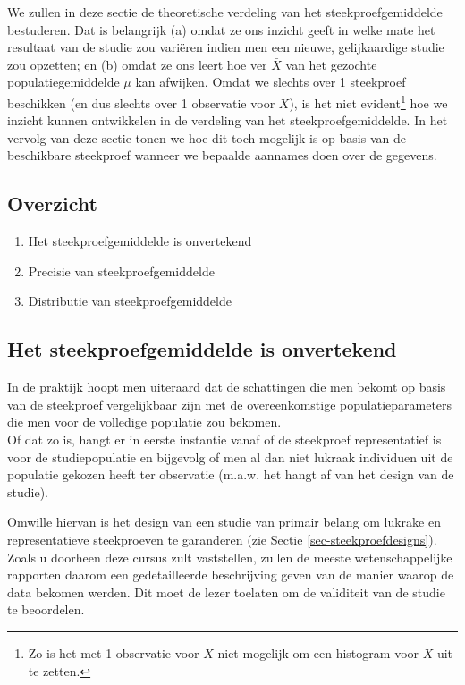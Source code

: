 \documentclass[
  dutch,
  letterpaper,
  12pt]{book}
\providecommand{\tightlist}{%
  \setlength{\itemsep}{0pt}\setlength{\parskip}{0pt}}
\theoremstyle{definition}
\theoremstyle{definition}
\theoremstyle{definition}
\theoremstyle{remark}
\begin{document}
We zullen in deze sectie de theoretische verdeling van het
steekproefgemiddelde bestuderen. Dat is belangrijk (a) omdat ze ons
inzicht geeft in welke mate het resultaat van de studie zou variëren
indien men een nieuwe, gelijkaardige studie zou opzetten; en (b) omdat
ze ons leert hoe ver \(\bar X\) van het gezochte populatiegemiddelde
\(\mu\) kan afwijken. Omdat we slechts over 1 steekproef beschikken (en
dus slechts over 1 observatie voor \(\bar X\)), is het niet
evident\footnote{Zo is het met 1 observatie voor \(\bar X\) niet
  mogelijk om een histogram voor \(\bar X\) uit te zetten.} hoe we
inzicht kunnen ontwikkelen in de verdeling van het steekproefgemiddelde.
In het vervolg van deze sectie tonen we hoe dit toch mogelijk is op
basis van de beschikbare steekproef wanneer we bepaalde aannames doen
over de gegevens.

\subsection{Overzicht}\label{overzicht}

\begin{enumerate}
\def\labelenumi{\arabic{enumi}.}
\tightlist
\item
  Het steekproefgemiddelde is onvertekend
\item
  Precisie van steekproefgemiddelde
\item
  Distributie van steekproefgemiddelde
\end{enumerate}

\subsection{Het steekproefgemiddelde is
onvertekend}\label{het-steekproefgemiddelde-is-onvertekend}

In de praktijk hoopt men uiteraard dat de schattingen die men bekomt op
basis van de steekproef vergelijkbaar zijn met de overeenkomstige
populatieparameters die men voor de volledige populatie zou bekomen.\\
Of dat zo is, hangt er in eerste instantie vanaf of de steekproef
representatief is voor de studiepopulatie en bijgevolg of men al dan
niet lukraak individuen uit de populatie gekozen heeft ter observatie
(m.a.w. het hangt af van het design van de studie).

Omwille hiervan is het design van een studie van primair belang om
lukrake en representatieve steekproeven te garanderen (zie Sectie
\ref{sec-steekproefdesigns}). Zoals u doorheen deze cursus zult
vaststellen, zullen de meeste wetenschappelijke rapporten daarom een
gedetailleerde beschrijving geven van de manier waarop de data bekomen
werden. Dit moet de lezer toelaten om de validiteit van de studie te
beoordelen.
\end{document}
